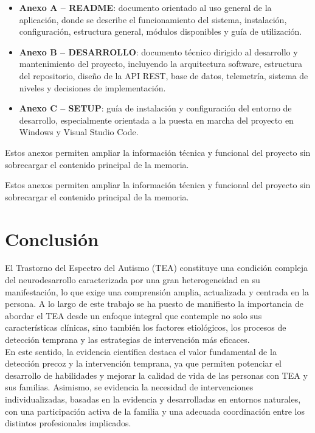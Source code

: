 \documentclass{article}
\begin{document}
\begin{itemize}
    \item \textbf{Anexo A -- README}: documento orientado al uso general de la aplicación, donde se describe el funcionamiento del sistema, instalación, configuración, estructura general, módulos disponibles y guía de utilización.
    
    \item \textbf{Anexo B -- DESARROLLO}: documento técnico dirigido al desarrollo y mantenimiento del proyecto, incluyendo la arquitectura software, estructura del repositorio, diseño de la API REST, base de datos, telemetría, sistema de niveles y decisiones de implementación.
    
    \item \textbf{Anexo C -- SETUP}: guía de instalación y configuración del entorno de desarrollo, especialmente orientada a la puesta en marcha del proyecto en Windows y Visual Studio Code.
\end{itemize}

Estos anexos permiten ampliar la información técnica y funcional del proyecto sin sobrecargar el contenido principal de la memoria.



Estos anexos permiten ampliar la información técnica y funcional del proyecto sin sobrecargar el contenido principal de la memoria.

\newpage
\section{\textbf{Conclusión}}
El Trastorno del Espectro del Autismo (TEA) constituye una condición compleja del neurodesarrollo caracterizada por una gran heterogeneidad en su manifestación, lo que exige una comprensión amplia, actualizada y centrada en la persona. A lo largo de este trabajo se ha puesto de manifiesto la importancia de abordar el TEA desde un enfoque integral que contemple no solo sus características clínicas, sino también los factores etiológicos, los procesos de detección temprana y las estrategias de intervención más eficaces.\\

En este sentido, la evidencia científica destaca el valor fundamental de la detección precoz y la intervención temprana, ya que permiten potenciar el desarrollo de habilidades y mejorar la calidad de vida de las personas con TEA y sus familias. Asimismo, se evidencia la necesidad de intervenciones individualizadas, basadas en la evidencia y desarrolladas en entornos naturales, con una participación activa de la familia y una adecuada coordinación entre los distintos profesionales implicados.\\
\end{document}
